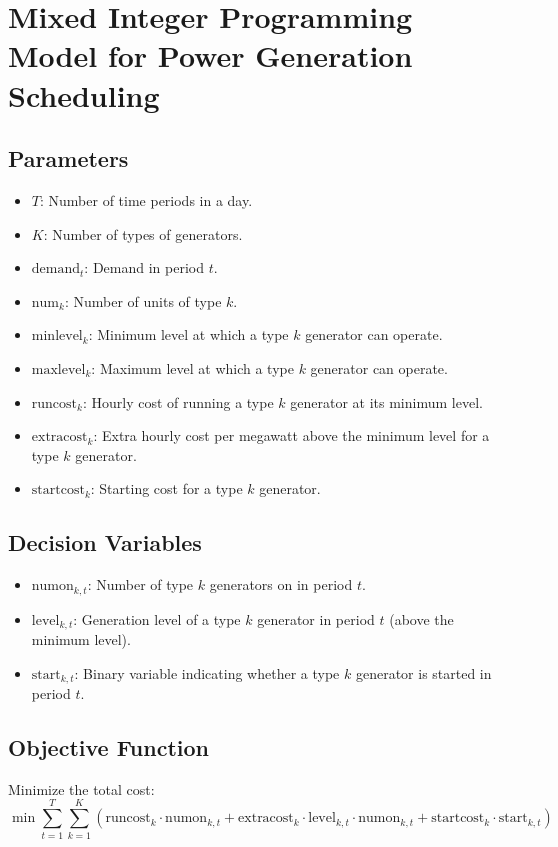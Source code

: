 \documentclass{article}
\begin{document}
\section*{Mixed Integer Programming Model for Power Generation Scheduling}

\subsection*{Parameters}
\begin{itemize}
    \item \( T \): Number of time periods in a day.
    \item \( K \): Number of types of generators.
    \item \( \text{demand}_t \): Demand in period \( t \).
    \item \( \text{num}_k \): Number of units of type \( k \).
    \item \( \text{minlevel}_k \): Minimum level at which a type \( k \) generator can operate.
    \item \( \text{maxlevel}_k \): Maximum level at which a type \( k \) generator can operate.
    \item \( \text{runcost}_k \): Hourly cost of running a type \( k \) generator at its minimum level.
    \item \( \text{extracost}_k \): Extra hourly cost per megawatt above the minimum level for a type \( k \) generator.
    \item \( \text{startcost}_k \): Starting cost for a type \( k \) generator.
\end{itemize}

\subsection*{Decision Variables}
\begin{itemize}
    \item \( \text{numon}_{k,t} \): Number of type \( k \) generators on in period \( t \).
    \item \( \text{level}_{k,t} \): Generation level of a type \( k \) generator in period \( t \) (above the minimum level).
    \item \( \text{start}_{k,t} \): Binary variable indicating whether a type \( k \) generator is started in period \( t \).
\end{itemize}

\subsection*{Objective Function}
Minimize the total cost:
\[
\min \sum_{t=1}^{T} \sum_{k=1}^{K} \left( \text{runcost}_k \cdot \text{numon}_{k,t} + \text{extracost}_k \cdot \text{level}_{k,t} \cdot \text{numon}_{k,t} + \text{startcost}_k \cdot \text{start}_{k,t} \right)
\]
\end{document}

